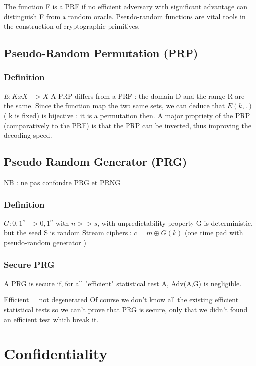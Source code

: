 The function F is a PRF if no efficient adversary with significant advantage can distinguish F from a random oracle. Pseudo-random functions are vital tools in the construction of cryptographic primitives.

\subsection{Pseudo-Random Permutation   (PRP)}


\subsubsection{Definition}

$E : KxX -> X$
A PRP differs from a PRF : the domain D and the range R are the same. Since the function map the two same sets, we can deduce that $E(k,.)$ ( k is fixed) is bijective : it is a permutation then.
A major propriety of the PRP (comparatively to the PRF) is that the PRP can be inverted, thus improving the decoding speed.


\subsection{Pseudo Random Generator     (PRG)} 

NB : ne pas confondre PRG et PRNG

\subsubsection{Definition}

$ G : {0,1}^s -> {0,1}^n $  with  $n>>s$, with unpredictability property
G is deterministic, but the seed S is random
Stream ciphers : $c = m \oplus G(k) $  (one time pad with pseudo-random generator )


\subsubsection{Secure PRG}
A PRG is secure if, for all "efficient" statistical test A, Adv(A,G) is negligible.

Efficient = not degenerated
Of course we don't know all the existing efficient statistical tests so we can't prove that PRG is secure, only that we didn't found an efficient test which break it.


\section{Confidentiality}
